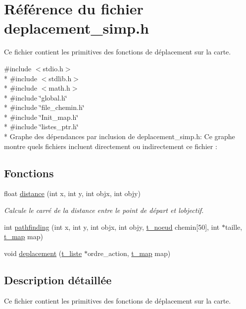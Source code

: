 \hypertarget{a00015}{}\section{Référence du fichier deplacement\+\_\+simp.\+h}
\label{a00015}


Ce fichier contient les primitives des fonctions de déplacement sur la carte.  


{\ttfamily \#include $<$stdio.\+h$>$}\\*
{\ttfamily \#include $<$stdlib.\+h$>$}\\*
{\ttfamily \#include $<$math.\+h$>$}\\*
{\ttfamily \#include \char`\"{}global.\+h\char`\"{}}\\*
{\ttfamily \#include \char`\"{}file\+\_\+chemin.\+h\char`\"{}}\\*
{\ttfamily \#include \char`\"{}Init\+\_\+map.\+h\char`\"{}}\\*
{\ttfamily \#include \char`\"{}listes\+\_\+ptr.\+h\char`\"{}}\\*
Graphe des dépendances par inclusion de deplacement\+\_\+simp.\+h\+:
Ce graphe montre quels fichiers incluent directement ou indirectement ce fichier \+:
\subsection*{Fonctions}
\begin{DoxyCompactItemize}
\item 
float \hyperlink{a00015_a0adbaf4db93dc33c02b0c3d9e9e256e0}{distance} (int x, int y, int objx, int objy)
\begin{DoxyCompactList}\small\item\em Calcule le carré de la distance entre le point de départ et l\textquotesingle{}objectif. \end{DoxyCompactList}\item 
int \hyperlink{a00015_a2b683d97d1725e260c204a6f76777c29}{pathfinding} (int x, int y, int objx, int objy, \hyperlink{a00009}{t\+\_\+noeud} chemin\mbox{[}50\mbox{]}, int $\ast$taille, \hyperlink{a00008}{t\+\_\+map} map)
\item 
void \hyperlink{a00015_a0e5b60d03bc28acdaf242928b45e6084}{deplacement} (\hyperlink{a00007}{t\+\_\+liste} $\ast$ordre\+\_\+action, \hyperlink{a00008}{t\+\_\+map} map)
\end{DoxyCompactItemize}


\subsection{Description détaillée}
Ce fichier contient les primitives des fonctions de déplacement sur la carte. 

